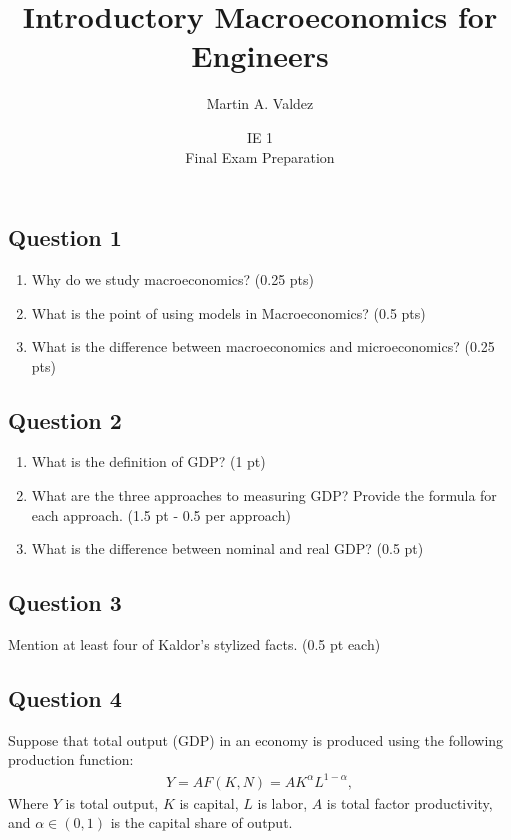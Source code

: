 \documentclass[11pt]{article}
\title{Introductory Macroeconomics for Engineers}
\author{Martin A. Valdez}
\date{IE 1\\
Final Exam Preparation}
\begin{document}
\maketitle

\subsection*{Question 1}

\begin{enumerate}
    \item Why do we study macroeconomics? (0.25 pts)
    \item What is the point of using models in Macroeconomics? (0.5 pts)
    \item What is the difference between macroeconomics and microeconomics? (0.25 pts)
\end{enumerate}

\subsection*{Question 2}
\begin{enumerate}
    \item What is the definition of GDP? (1 pt)
    \item What are the three approaches to measuring GDP? Provide the formula for each approach. (1.5 pt - 0.5 per approach)
    \item What is the difference between nominal and real GDP? (0.5 pt)
\end{enumerate}

\subsection*{Question 3}
Mention at least four of Kaldor's stylized facts. (0.5 pt each)

\subsection*{Question 4}
Suppose that total output (GDP) in an economy is produced using the following production function:
\begin{align*}
    Y = A F(K,N) = A K^{\alpha} L^{1-\alpha},
\end{align*}
Where \(Y\) is total output, \(K\) is capital, \(L\) is labor, \(A\) is total factor productivity, and \(\alpha \in (0,1)\) 
is the capital share of output.
\end{document}
